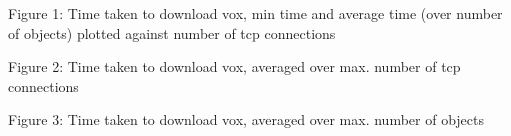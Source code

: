 \documentclass[12pt]{article}
\begin{document}
\begin{center}Figure 1: Time taken to download vox, min time and average time (over number of objects) plotted against number of tcp connections\end{center}

\hspace*{0.6cm}
{
}
\begin{center}Figure 2: Time taken to download vox, averaged over max. number of tcp connections\end{center}

\hspace*{0.6cm}
{
}
\begin{center}Figure 3: Time taken to download vox, averaged over max. number of objects\end{center}
\end{document}
